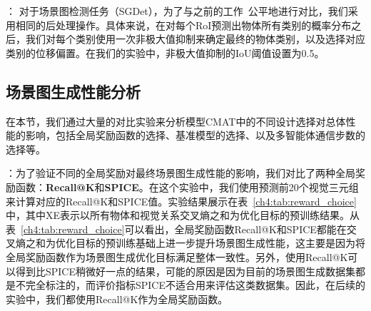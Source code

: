 \textbf{}： 对于场景图检测任务（SGDet），为了与之前的工作~\cite{zellers2018neural,zhang2019graphical}公平地进行对比，我们采用相同的后处理操作。具体来说，在对每个RoI预测出物体所有类别的概率分布之后，我们对每个类别使用一次非极大值抑制来确定最终的物体类别，以及选择对应类别的位移偏置。在我们的实验中，非极大值抑制的IoU阈值设置为0.5。


\subsection{场景图生成性能分析}
在本节，我们通过大量的对比实验来分析模型CMAT中的不同设计选择对总体性能的影响，包括全局奖励函数的选择、基准模型的选择、以及多智能体通信步数的选择等。

\textbf{}：为了验证不同的全局奖励对最终场景图生成性能的影响，我们对比了两种全局奖励函数：\textbf{Recall@K}和\textbf{SPICE}。在这个实验中，我们使用预测前20个视觉三元组来计算对应的Recall@K和SPICE值。实验结果展示在表~\ref{ch4:tab:reward_choice}中，其中XE表示以所有物体和视觉关系交叉熵之和为优化目标的预训练结果。从表~\ref{ch4:tab:reward_choice}可以看出，全局奖励函数Recall@K和SPICE都能在交叉熵之和为优化目标的预训练基础上进一步提升场景图生成性能，这主要是因为将全局奖励函数作为场景图生成优化目标满足整体一致性。另外，使用Recall@K可以得到比SPICE稍微好一点的结果，可能的原因是因为目前的场景图生成数据集都是不完全标注的，而评价指标SPICE不适合用来评估这类数据集。因此，在后续的实验中，我们都使用Recall@K作为全局奖励函数。

\begin{table}[t]
\begin{center}
\end{center}
\caption{不同全局奖励函数对性能的影响}
\label{ch4:tab:reward_choice}
\end{table}

